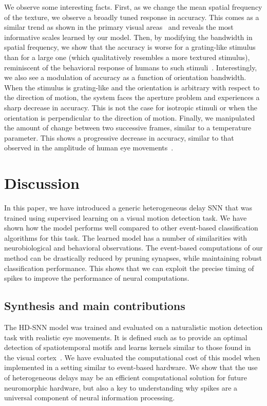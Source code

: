 \documentclass[default]{sn-jnl}%
\theoremstyle{thmstyleone}%
\theoremstyle{thmstyletwo}%
\theoremstyle{thmstylethree}%
\begin{document}
We observe some interesting facts. First, as we change the mean spatial frequency of the texture, we observe a broadly tuned response in accuracy. This comes as a similar trend as shown in the primary visual areas~\citep{priebe_tuning_2006,Perrinet2007} and reveals the most informative scales learned by our model. Then, by modifying the bandwidth in spatial frequency, we show that the accuracy is worse for a grating-like stimulus than for a large one (which qualitatively resembles a more textured stimulus), reminiscent of the behavioral response of humans to such stimuli~\citep{simoncini_more_2012, ravello_speed-selectivity_2019}. Interestingly, we also see a modulation of accuracy as a function of orientation bandwidth. When the stimulus is grating-like and the orientation is arbitrary with respect to the direction of motion, the system faces the aperture problem and experiences a sharp decrease in accuracy. This is not the case for isotropic stimuli or when the orientation is perpendicular to the direction of motion. Finally, we manipulated the amount of change between two successive frames, similar to a temperature parameter. This shows a progressive decrease in accuracy, similar to that observed in the amplitude of human eye movements~\citep{mansour_pour_speed_2018}.
%
\section{Discussion}
In this paper, we have introduced a generic heterogeneous delay SNN that was trained using supervised learning on a visual motion detection task. We have shown how the model performs well compared to other event-based classification algorithms for this task. The learned model has a number of similarities with neurobiological and behavioral observations. The event-based computations of our method can be drastically reduced by pruning synapses, while maintaining robust classification performance. This shows that we can exploit the precise timing of spikes to improve the performance of neural computations.
%
\subsection{Synthesis and main contributions}
The HD-SNN model was trained and evaluated on a naturalistic motion detection task with realistic eye movements. It is defined such as to provide an optimal detection of  spatiotemporal motifs and learns kernels similar to those found in the visual cortex~\cite{deangelis_functional_1999, kremkow_push-pull_2016}. We have evaluated the computational cost of this model when implemented in a setting similar to event-based hardware. We show that the use of heterogeneous delays may be an efficient computational solution for future neuromorphic hardware, but also a key to understanding why spikes are a universal component of neural information processing.
\end{document}
